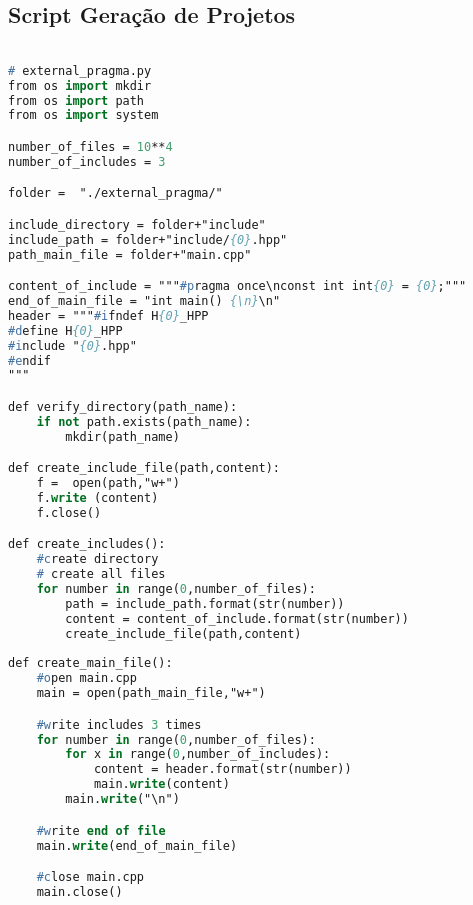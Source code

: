 \begin{apendicesenv}

\partapendices

\chapter{Script Geração de Projetos}


\begin{lstlisting}[language=Pascal,frame=single,captionpos=b,
                                                caption={
                     Script usando para gerar diretorios com Guardas de Inclusão Externa
                                                                         mais pragma once},
                                                            label=script_external_pragma_include]

# external_pragma.py
from os import mkdir
from os import path
from os import system

number_of_files = 10**4
number_of_includes = 3

folder =  "./external_pragma/"

include_directory = folder+"include"
include_path = folder+"include/{0}.hpp"
path_main_file = folder+"main.cpp"

content_of_include = """#pragma once\nconst int int{0} = {0};"""
end_of_main_file = "int main() {\n}\n"
header = """#ifndef H{0}_HPP
#define H{0}_HPP
#include "{0}.hpp"
#endif
"""

def verify_directory(path_name):
    if not path.exists(path_name):
        mkdir(path_name)

def create_include_file(path,content):
    f =  open(path,"w+")
    f.write (content)
    f.close()

def create_includes():
    #create directory
    # create all files
    for number in range(0,number_of_files):
        path = include_path.format(str(number))
        content = content_of_include.format(str(number))
        create_include_file(path,content)
    
def create_main_file():
    #open main.cpp
    main = open(path_main_file,"w+")

    #write includes 3 times
    for number in range(0,number_of_files):
        for x in range(0,number_of_includes):
            content = header.format(str(number))
            main.write(content)
        main.write("\n")

    #write end of file
    main.write(end_of_main_file)

    #close main.cpp
    main.close()
                                                                                  

\end{lstlisting}
\end{apendicesenv}
